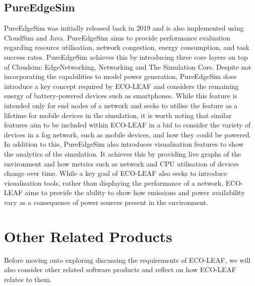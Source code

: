 \documentclass{l4proj}
\begin{document}
\subsection{PureEdgeSim}
PureEdgeSim \citep{pureedgesim} was initially released back in 2019 and is also implemented using CloudSim and Java.
PureEdgeSim aims to provide performance evaluation regarding resource utilisation, network congestion, energy consumption, and task success rates.
PureEdgeSim achieves this by introducing three core layers on top of Cloudsim: EdgeNetworking, Networking and The Simulation Core.
Despite not incorporating the capabilities to model power generation, PureEdgeSim does introduce a key concept required by ECO-LEAF and considers the remaining energy of battery-powered devices such as smartphones.
While this feature is intended only for end nodes of a network and seeks to utilise the feature as a lifetime for mobile devices in the simulation, it is worth noting that similar features aim to be included within ECO-LEAF in a bid to consider the variety of devices in a fog network, such as mobile devices, and how they could be powered.
In addition to this, PureEdgeSim also introduces visualisation features to show the analytics of the simulation.
It achieves this by providing live graphs of the environment and how metrics such as network and CPU utilisation of devices change over time.
While a key goal of ECO-LEAF also seeks to introduce visualisation tools, rather than displaying the performance of a network, ECO-LEAF aims to provide the ability to show how emissions and power availability vary as a consequence of power sources present in the environment.

\section{Other Related Products}
Before moving onto exploring discussing the requirements of ECO-LEAF, we will also consider other related software products and reflect on how ECO-LEAF relates to them.
\end{document}
